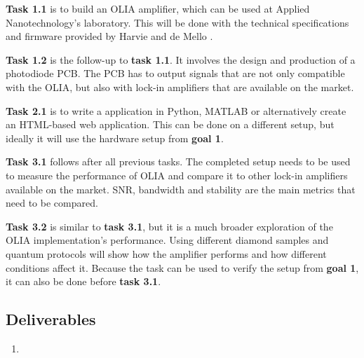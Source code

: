 \documentclass{report}
\begin{document}
	\textbf{Task 1.1} is to build an OLIA amplifier, which can be used at Applied Nanotechnology's laboratory. This will be done with the technical specifications and firmware provided by Harvie and de Mello \cite{harvie2023olia}. %
	
	\textbf{Task 1.2} is the follow-up to \textbf{task 1.1}. It involves the design and production of a photodiode PCB. The PCB has to output signals that are not only compatible with the OLIA, but also with lock-in amplifiers that are available on the market. %
	
	\textbf{Task 2.1} is to write a application in Python, MATLAB or alternatively create an HTML-based web application. This can be done on a different setup, but ideally it will use the hardware setup from \textbf{goal 1}. %
	
	
	\textbf{Task 3.1} follows after all previous tasks. The completed setup needs to be used to measure the performance of OLIA and compare it to other lock-in amplifiers available on the market. SNR, bandwidth and stability are the main metrics that need to be compared. %
	
	\textbf{Task 3.2} is similar to \textbf{task 3.1}, but it is a much broader exploration of the OLIA implementation's performance. Using different diamond samples and quantum protocols will show how the amplifier performs and how different conditions affect it. Because the task can be used to verify the setup from \textbf{goal 1}, it can also be done before \textbf{task 3.1}.
	
	
	\subsection{Deliverables}
	\begin{enumerate}
		\item 
	\end{enumerate}
	
	
	
\end{document}
